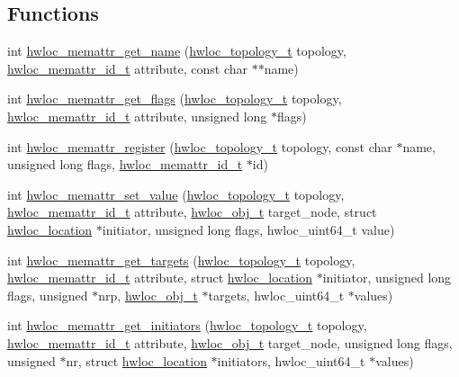 \subsection*{Functions}
\begin{DoxyCompactItemize}
\item 
int \hyperlink{a00212_ga5300e9be1abdea2e00c18492148aecd0}{hwloc\+\_\+memattr\+\_\+get\+\_\+name} (\hyperlink{a00186_ga9d1e76ee15a7dee158b786c30b6a6e38}{hwloc\+\_\+topology\+\_\+t} topology, \hyperlink{a00211_gacc82003a8610be554615995f0996c888}{hwloc\+\_\+memattr\+\_\+id\+\_\+t} attribute, const char $\ast$$\ast$name)
\item 
int \hyperlink{a00212_ga4c62b626085adeaffb233e5f2a03a5eb}{hwloc\+\_\+memattr\+\_\+get\+\_\+flags} (\hyperlink{a00186_ga9d1e76ee15a7dee158b786c30b6a6e38}{hwloc\+\_\+topology\+\_\+t} topology, \hyperlink{a00211_gacc82003a8610be554615995f0996c888}{hwloc\+\_\+memattr\+\_\+id\+\_\+t} attribute, unsigned long $\ast$flags)
\item 
int \hyperlink{a00212_ga770657d1e44b09e93e09f623936c1e5f}{hwloc\+\_\+memattr\+\_\+register} (\hyperlink{a00186_ga9d1e76ee15a7dee158b786c30b6a6e38}{hwloc\+\_\+topology\+\_\+t} topology, const char $\ast$name, unsigned long flags, \hyperlink{a00211_gacc82003a8610be554615995f0996c888}{hwloc\+\_\+memattr\+\_\+id\+\_\+t} $\ast$id)
\item 
int \hyperlink{a00212_ga960529c08b25cf15825e0f72ecceb504}{hwloc\+\_\+memattr\+\_\+set\+\_\+value} (\hyperlink{a00186_ga9d1e76ee15a7dee158b786c30b6a6e38}{hwloc\+\_\+topology\+\_\+t} topology, \hyperlink{a00211_gacc82003a8610be554615995f0996c888}{hwloc\+\_\+memattr\+\_\+id\+\_\+t} attribute, \hyperlink{a00185_ga79b8ab56877ef99ac59b833203391c7d}{hwloc\+\_\+obj\+\_\+t} target\+\_\+node, struct \hyperlink{a00314}{hwloc\+\_\+location} $\ast$initiator, unsigned long flags, hwloc\+\_\+uint64\+\_\+t value)
\item 
int \hyperlink{a00212_ga3177cc0ab47e4dd1fa69ca1df4c7cb1a}{hwloc\+\_\+memattr\+\_\+get\+\_\+targets} (\hyperlink{a00186_ga9d1e76ee15a7dee158b786c30b6a6e38}{hwloc\+\_\+topology\+\_\+t} topology, \hyperlink{a00211_gacc82003a8610be554615995f0996c888}{hwloc\+\_\+memattr\+\_\+id\+\_\+t} attribute, struct \hyperlink{a00314}{hwloc\+\_\+location} $\ast$initiator, unsigned long flags, unsigned $\ast$nrp, \hyperlink{a00185_ga79b8ab56877ef99ac59b833203391c7d}{hwloc\+\_\+obj\+\_\+t} $\ast$targets, hwloc\+\_\+uint64\+\_\+t $\ast$values)
\item 
int \hyperlink{a00212_ga049aaa860dcbbf0792f0fd4251a99ec0}{hwloc\+\_\+memattr\+\_\+get\+\_\+initiators} (\hyperlink{a00186_ga9d1e76ee15a7dee158b786c30b6a6e38}{hwloc\+\_\+topology\+\_\+t} topology, \hyperlink{a00211_gacc82003a8610be554615995f0996c888}{hwloc\+\_\+memattr\+\_\+id\+\_\+t} attribute, \hyperlink{a00185_ga79b8ab56877ef99ac59b833203391c7d}{hwloc\+\_\+obj\+\_\+t} target\+\_\+node, unsigned long flags, unsigned $\ast$nr, struct \hyperlink{a00314}{hwloc\+\_\+location} $\ast$initiators, hwloc\+\_\+uint64\+\_\+t $\ast$values)
\end{DoxyCompactItemize}


